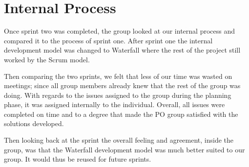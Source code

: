 \section{Internal Process}
Once sprint two was completed, the group looked at our internal process and compared it to the process of sprint one. 
After sprint one the internal development model was changed to Waterfall where the rest of the project still worked by the Scrum model.

Then comparing the two sprints, we felt that less of our time was wasted on meetings; since all group members already knew that the rest of the group was doing. 
With regards to the issues assigned to the group during the planning phase, it was assigned internally to the individual. 
Overall, all issues were completed on time and to a degree that made the PO group satisfied with the solutions developed. 

Then looking back at the sprint the overall feeling and agreement, inside the group, was that the Waterfall development model was much better suited to our group. 
It would thus be reused for future sprints.
